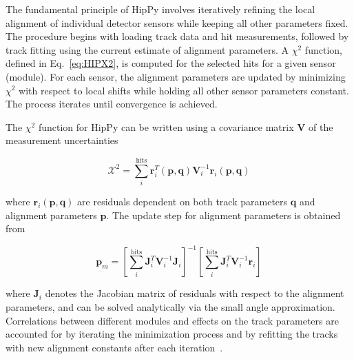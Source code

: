 The fundamental principle of HipPy involves iteratively refining the local alignment of individual detector sensors while keeping all other parameters fixed. The procedure begins with loading track data and hit measurements, followed by track fitting using the current estimate of alignment parameters. A \(\chi^2\) function, defined in Eq.~\eqref{eq:HIPX2}, is computed for the selected hits for a given sensor (module). For each sensor, the alignment parameters are updated by minimizing \(\chi^2\) with respect to local shifts while holding all other sensor parameters constant. The process iterates until convergence is achieved.



The \(\chi^2\) function for HipPy can be written using a covariance matrix \(\mathbf{V}\) of the measurement uncertainties

\begin{equation}
\label{eq:HIPX2}
\mathcal{X}^2 = \sum_{i}^{\text{hits}} \mathbf{r}_i^T(\mathbf{p}, \mathbf{q}) \mathbf{V}_i^{-1} \mathbf{r}_i(\mathbf{p}, \mathbf{q})
\end{equation}

where \(\mathbf{r}_i(\mathbf{p}, \mathbf{q})\) are residuals dependent on both track parameters \(\mathbf{q}\) and alignment parameters \(\mathbf{p}\). The update step for alignment parameters is obtained from

\begin{equation}
\label{eq:HPpm}
\mathbf{p}_m = \left[\sum_{i}^{\text{hits}} \mathbf{J}_i^T \mathbf{V}_i^{-1} \mathbf{J}_i\right]^{-1} \left[\sum_{i}^{\text{hits}} \mathbf{J}_i^T \mathbf{V}_i^{-1} \mathbf{r}_i\right]
\end{equation}

where \(\mathbf{J}_i\) denotes the Jacobian matrix of residuals with respect to the alignment parameters, and can be solved analytically via the small angle approximation. Correlations between different modules and effects on the track parameters are accounted for by iterating the minimization process and by refitting the tracks with new alignment constants after each iteration~\cite{WAdam_2009}. 

